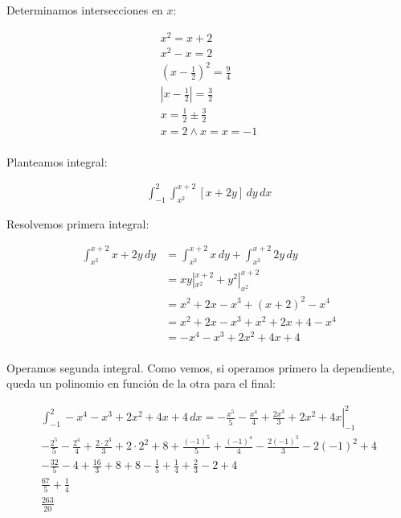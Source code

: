 Determinamos intersecciones en \(x\):

\begin{align*}
    x^{2} = x + 2 \\
    x^{2} - x = 2 \\
    (x-\frac{1}{2})^{2} = \frac{9}{4} \\
    |x-\frac{1}{2}| = \frac{3}{2} \\
    x = \frac{1}{2} \pm \frac{3}{2} \\ 
    x = 2 \land x = x = -1 \\
\end{align*}

Planteamos integral:

\begin{align*}
    \int_{-1}^{2} \int_{x^{2}}^{x+2}[ x + 2y ]\,dy \,dx
\end{align*}

Resolvemos primera integral:

\begin{align*}
    \int_{x^{2}}^{x+2} x + 2y \,dy & = \int_{x^{2}}^{x+2} x \,dy + \int_{x^{2}}^{x+2} 2y \,dy \\
    & = xy|_{x^{2}}^{x+2} + y^{2}|_{x^{2}}^{x+2} \\
    & = x^{2} + 2x - x^{3} + (x+2)^{2} - x^{4} \\
    & = x^{2} + 2x - x^{3} + x^{2} + 2x + 4 - x^{4} \\
    & = -x^{4} - x^{3} + 2x^{2} + 4x + 4 \\
\end{align*}

Operamos segunda integral.
Como vemos, si operamos primero la dependiente,
queda un polinomio en función de la otra para el final: 

\begin{gather*}
    \int_{-1}^{2} -x^{4} - x^{3} + 2x^{2} + 4x + 4 \,dx = \left.-\frac{x^{5}}{5} - \frac{x^{4}}{4} + \frac{2x^{3}}{3} + 2x^{2} + 4x\right|_{-1}^{2} \\
    -\frac{2^{5}}{5} - \frac{2^{4}}{4} + \frac{2\cdot2^{3}}{3} + 2\cdot2^{2} + 8 + \frac{(-1)^{5}}{5} + \frac{(-1)^{4}}{4} - \frac{2(-1)^{3}}{3} - 2(-1)^{2} + 4 \\
    -\frac{32}{5} - 4 + \frac{16}{3} + 8 + 8 - \frac{1}{5} + \frac{1}{4} + \frac{2}{3} - 2 + 4 \\
    \frac{67}{5} + \frac{1}{4} \\
    \boxed{\frac{263}{20}} \\
\end{gather*}